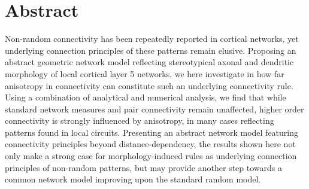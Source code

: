 \begingroup
\let\clearpage\relax
\let\cleardoublepage\relax
\let\cleardoublepage\relax

\chapter*{Abstract}

Non-random connectivity has been repeatedly reported in cortical
networks, yet underlying connection principles of these patterns
remain elusive. Proposing an abstract geometric network model
reflecting stereotypical axonal and dendritic morphology of local
cortical layer 5 networks, we here investigate in how far anisotropy
in connectivity can constitute such an underlying connectivity
rule. Using a combination of analytical and numerical analysis, we
find that while standard network measures and pair connectivity remain
unaffected, higher order connectivity is strongly influenced by
anisotropy, in many cases reflecting patterns found in local
circuits. Presenting an abstract network model featuring connectivity
principles beyond distance-dependency, the results shown here not only
make a strong case for morphology-induced rules as underlying
connection principles of non-random patterns, but may provide another
step towards a common network model improving upon the standard random
model.











\endgroup			

\vfill

